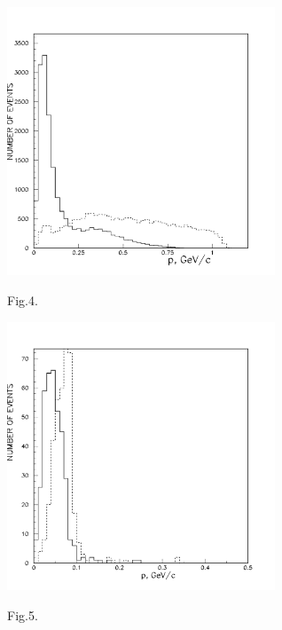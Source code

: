 \documentclass[a4paper,12pt]{article}
\begin{document}
    \begin{figure}[hbt]
      \begin{center}
        \includegraphics[width=8cm]{mompp.pdf}
      \end{center}
      \vspace {0.4cm}
      Fig.4.
    \end{figure}
    \newpage
    \begin{figure}[hbt]
      \begin{center}
        \includegraphics[width=8cm]{mom3d.pdf}
      \end{center}
      \vspace {0.4cm}
      Fig.5.
    \end{figure}
\end{document}
